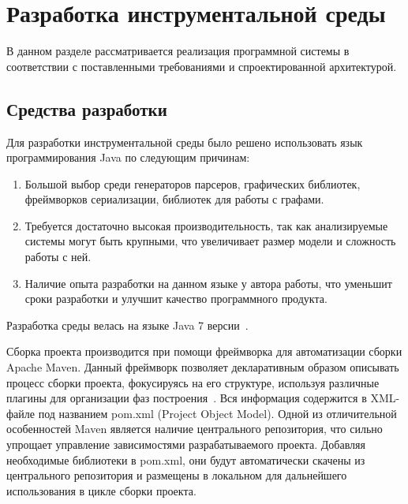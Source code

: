 \chapter{Разработка инструментальной среды}
\label{chap:realisation}

В данном разделе рассматривается реализация программной системы в соответствии
с поставленными требованиями и спроектированной архитектурой.

\section{Средства разработки}

Для разработки инструментальной среды было решено использовать язык
программирования Java по следующим причинам:

\begin{enumerate}
    \item Большой выбор среди генераторов парсеров, графических библиотек,
    фреймворков сериализации, библиотек для работы с графами.
    \item Требуется достаточно высокая производительность, так как анализируемые
    системы могут быть крупными, что увеличивает размер модели и сложность
    работы с ней.
    \item Наличие опыта разработки на данном языке у автора  работы, что
    уменьшит сроки разработки и улучшит качество программного продукта.
\end{enumerate}

Разработка среды велась на языке Java 7 версии~\cite{Gosling2013}.

Сборка проекта производится при помощи фреймворка для автоматизации сборки
Apache Maven. Данный фреймворк позволяет декларативным образом описывать процесс
сборки проекта, фокусируясь на его структуре, используя различные плагины для
организации фаз построения~\cite{Maven2001-2005}. Вся информация содержится в
XML-файле под названием pom.xml (Project Object Model). Одной из отличительной
особенностей Maven является наличие центрального репозитория, что сильно
упрощает управление зависимостями разрабатываемого проекта. Добавляя необходимые
библиотеки в pom.xml, они будут автоматически скачены из центрального
репозитория и размещены в локальном для дальнейшего использования в цикле сборки
проекта.

